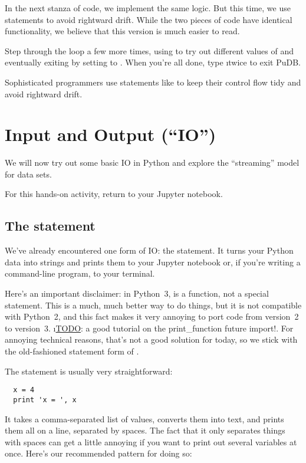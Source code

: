 \documentclass[letterpaper, 12pt, titlepage, twoside]{article}
\begin{document}
In the next stanza of code, we implement the same logic. But this time, we use
 statements to avoid rightward drift. While the two pieces of code
have identical functionality, we believe that this version is \i{much} easier
to read.

\typeit Step through the loop a few more times, using  to try out
different values of  and eventually exiting by setting
 to . When you're all done, type  \i{twice} to
exit PuDB.

Sophisticated programmers use statements like  to keep their
control flow tidy and avoid rightward drift.


\newpage
\section{Input and Output (``IO'')}

We will now try out some basic IO in Python and explore the ``streaming''
model for data sets.

For this hands-on activity, return to your Jupyter notebook.

\subsection*{The  statement}

We've already encountered one form of IO: the  statement. It turns
your Python data into strings and prints them to your Jupyter notebook or, if
you're writing a command-line program, to your terminal.

Here's an \i{important disclaimer:} in Python~3,  is a function,
not a special statement. This is a much, much better way to do things, but it
is not compatible with Python~2, and this fact makes it very annoying to port
code from version~2 to version~3. \i{\underline{TODO}: a good tutorial on the
  print\_function future import!}. For annoying technical reasons, that's not
a good solution for today, so we stick with the old-fashioned statement form
of .

The  statement is usually very straightforward:

\begin{lstlisting}
  x = 4
  print 'x = ', x
\end{lstlisting}

It takes a comma-separated list of values, converts them into text, and prints
them all on a line, separated by spaces. The fact that it only separates
things with spaces can get a little annoying if you want to print out several
variables at once. Here's our recommended pattern for doing so:
\end{document}
